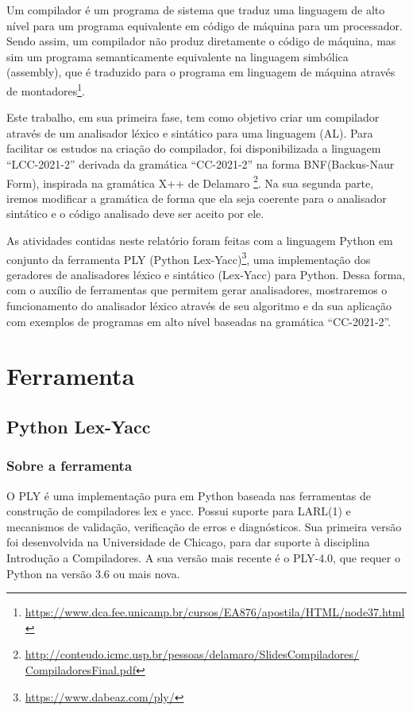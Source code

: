 \documentclass[
	12pt,				%
	openright,			%
	twoside,			%
	a4paper,			%
	english,			%
	french,				%
	spanish,			%
	brazil				%
	]{abntex2}
\begin{document}
Um compilador é um programa de sistema que traduz uma linguagem de alto nível
para um programa equivalente em código de máquina para um processador. Sendo assim,
um compilador não produz diretamente o código de máquina, mas sim um programa
semanticamente equivalente na linguagem simbólica (assembly), que é traduzido para o programa em linguagem de máquina através de montadores\footnote{\url{https://www.dca.fee.unicamp.br/cursos/EA876/apostila/HTML/node37.html}}.

Este trabalho, em sua primeira fase, tem como objetivo criar um compilador através de um
analisador léxico e sintático para uma linguagem (AL). Para facilitar os estudos na criação do compilador,
foi disponibilizada a linguagem ``LCC-2021-2'' derivada da gramática ``CC-2021-2''
na forma BNF(Backus-Naur Form), inspirada na gramática X++ de Delamaro
\footnote{\url{http://conteudo.icmc.usp.br/pessoas/delamaro/SlidesCompiladores/
CompiladoresFinal.pdf}}. Na sua segunda parte, iremos modificar a gramática
de forma que ela seja coerente para o analisador sintático e o código analisado
deve ser aceito por ele.

As atividades contidas neste relatório foram feitas com a linguagem Python em
conjunto da ferramenta PLY (Python Lex-Yacc)\footnote{\url{https://www.dabeaz.com/ply/}},
uma implementação dos geradores de analisadores léxico e sintático (Lex-Yacc) para Python.
Dessa forma, com o auxílio de ferramentas que permitem gerar analisadores, mostraremos
o funcionamento do analisador léxico através de seu algoritmo e da sua aplicação com 
exemplos de programas em alto nível baseadas na gramática ``CC-2021-2''.




\part{Ferramenta}
\chapter{Python Lex-Yacc}
\section{Sobre a ferramenta}
O PLY é uma implementação pura em Python baseada nas ferramentas de construção
de compiladores lex e yacc. Possui suporte para LARL(1) e mecanismos
de validação, verificação de erros e diagnósticos. Sua primeira versão foi desenvolvida
na Universidade de Chicago, para dar suporte à disciplina Introdução a Compiladores.
A sua versão mais recente é o PLY-4.0, que requer o Python na versão 3.6 ou mais nova. 
\end{document}
